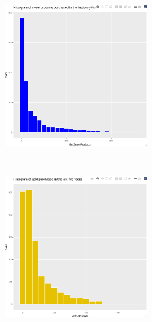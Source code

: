 \begin{frame}[fragile]
\begin{figure}
\begin{minipage}{.3\textwidth}
\begin{subfigure}{\textwidth}
            \includegraphics[width=0.7\textwidth]{Img/eda/EDA022.png}
            \end{subfigure}\\
            \begin{subfigure}{\textwidth}
            \centering
            \includegraphics[width=0.7\textwidth]{Img/eda/EDA023.png}
            \end{subfigure}
        \end{minipage}%
    \end{figure}
\end{frame}
